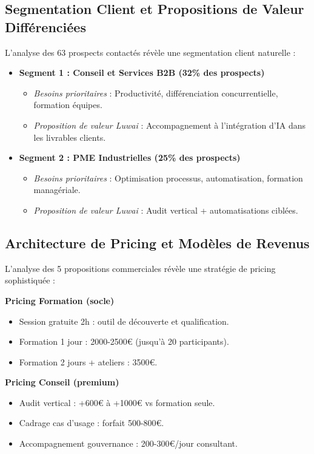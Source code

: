 \subsection{Segmentation Client et Propositions de Valeur Différenciées}

L'analyse des 63 prospects contactés révèle une segmentation client naturelle :

\begin{itemize}
    \item \textbf{Segment 1 : Conseil et Services B2B (32\% des prospects)}
    \begin{itemize}
        \item \emph{Besoins prioritaires} : Productivité, différenciation concurrentielle, formation équipes.
        \item \emph{Proposition de valeur Luwai} : Accompagnement à l'intégration d'IA dans les livrables clients.
    \end{itemize}
    \item \textbf{Segment 2 : PME Industrielles (25\% des prospects)}
    \begin{itemize}
        \item \emph{Besoins prioritaires} : Optimisation processus, automatisation, formation managériale.
        \item \emph{Proposition de valeur Luwai} : Audit vertical + automatisations ciblées.
    \end{itemize}
\end{itemize}

\subsection{Architecture de Pricing et Modèles de Revenus}

L'analyse des 5 propositions commerciales \cite{luwai2025aesio, luwai2025antilogy, luwai2025integrhale, luwai2025carecall, luwai2025tectona} révèle une stratégie de pricing sophistiquée :

\textbf{Pricing Formation (socle)}
\begin{itemize}
    \item Session gratuite 2h : outil de découverte et qualification.
    \item Formation 1 jour : 2000-2500€ (jusqu'à 20 participants).
    \item Formation 2 jours + ateliers : 3500€.
\end{itemize}

\textbf{Pricing Conseil (premium)}
\begin{itemize}
    \item Audit vertical : +600€ à +1000€ vs formation seule.
    \item Cadrage cas d'usage : forfait 500-800€.
    \item Accompagnement gouvernance : 200-300€/jour consultant.
\end{itemize}


